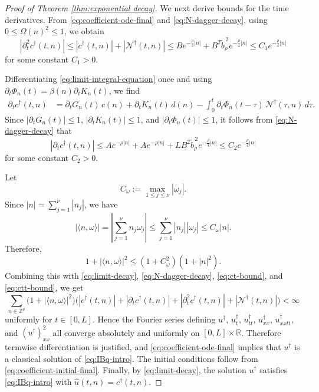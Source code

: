 \documentclass[12pt,reqno,tbtags]{amsart}
\newcommand\1{\mathbbm{1}}
\begin{document}
\begin{proof}[Proof of Theorem \ref{thm:exponential decay}]
We next derive bounds for the time derivatives. From
\eqref{eq:coefficient-ode-final} and \eqref{eq:N-dagger-decay}, using
$0\leq \Omega(n)^2\leq 1$, we obtain
\begin{equation}\label{eq:ctt-bound}
|\partial_t^2 c^{\dagger}(t,n)|
\leq
|c^{\dagger}(t,n)|+|\mathcal{N}^{\dagger}(t,n)|
\leq
B e^{-\frac{\rho}{2}|n|}
+
B^2 \widetilde b_{\rho}^{\,2} e^{-\frac{\rho}{4}|n|}
\leq
C_1 e^{-\frac{\rho}{4}|n|}
\end{equation}
for some constant $C_1>0$.

Differentiating \eqref{eq:limit-integral-equation} once and using
$\partial_t \Phi_n(t)=\beta(n)\partial_t K_n(t)$, we find
\begin{align*}
\partial_t c^{\dagger}(t,n)
&=
\partial_t G_n(t)\,c(n)
+
\partial_t K_n(t)\,d(n)
-
\int_0^t \partial_t \Phi_n(t-\tau)\,\mathcal{N}^{\dagger}(\tau,n)\,d\tau .
\end{align*}
Since $|\partial_t G_n(t)|\leq 1$, $|\partial_t K_n(t)|\leq 1$, and
$|\partial_t \Phi_n(t)|\leq 1$, it follows from
\eqref{eq:N-dagger-decay} that
\begin{equation}\label{eq:ct-bound}
|\partial_t c^{\dagger}(t,n)|
\leq
A e^{-\rho|n|}
+
A e^{-\rho|n|}
+
L B^2 \widetilde b_{\rho}^{\,2} e^{-\frac{\rho}{4}|n|}
\leq
C_2 e^{-\frac{\rho}{4}|n|}
\end{equation}
for some constant $C_2>0$.

Let
\[
C_{\omega}:=\max_{1\leq j\leq \nu} |\omega_j|.
\]
Since $|n|=\sum_{j=1}^{\nu}|n_j|$, we have
\begin{equation*}
|\langle n,\omega\rangle|
=
\left|\sum_{j=1}^{\nu} n_j\omega_j\right|
\leq
\sum_{j=1}^{\nu} |n_j||\omega_j|
\leq
C_{\omega}|n|.
\end{equation*}
Therefore,
\[
1+|\langle n,\omega\rangle|^2 \leq (1+C_{\omega}^2)(1+|n|^2).
\]
Combining this with \eqref{eq:limit-decay}, \eqref{eq:N-dagger-decay},
\eqref{eq:ct-bound}, and \eqref{eq:ctt-bound}, we get
\[
\sum_{n\in \mathbb{Z}^{\nu}}
\big(1+|\langle n,\omega\rangle|^2\big)
\Big(
|c^{\dagger}(t,n)|+|\partial_t c^{\dagger}(t,n)|
+|\partial_t^2 c^{\dagger}(t,n)|+|\mathcal{N}^{\dagger}(t,n)|
\Big)
<\infty
\]
uniformly for $t\in [0,L]$. Hence the Fourier series defining
$u^{\dagger}$, $u_t^{\dagger}$, $u_{tt}^{\dagger}$, $u_{xx}^{\dagger}$,
$u_{xxtt}^{\dagger}$, and $(u^{\dagger})^2_{xx}$ all converge absolutely and uniformly
on $[0,L]\times \mathbb{R}$. Therefore termwise differentiation is justified, and
\eqref{eq:coefficient-ode-final} implies that $u^{\dagger}$ is a classical solution of
\eqref{eq:IBq-intro}. The initial conditions follow from \eqref{eq:coefficient-initial-final}.
Finally, by \eqref{eq:limit-decay}, the solution $u^{\dagger}$ satisfies
\eqref{eq:IBq-intro} with $\widehat u(t,n)=c^{\dagger}(t,n)$.


\end{proof}
\end{document}
